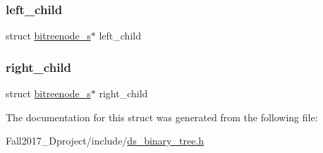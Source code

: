 \mbox{\label{structbitreenode__s_aca9af0f3ba369b6aff616640a0b842aa}} 
\subsubsection{\texorpdfstring{left\+\_\+child}{left\_child}}
{\footnotesize\ttfamily struct \hyperlink{structbitreenode__s}{bitreenode\+\_\+s}$\ast$ left\+\_\+child}

\mbox{\label{structbitreenode__s_a27d28175093bd9993fc8ad15496114c0}} 
\subsubsection{\texorpdfstring{right\+\_\+child}{right\_child}}
{\footnotesize\ttfamily struct \hyperlink{structbitreenode__s}{bitreenode\+\_\+s}$\ast$ right\+\_\+child}



The documentation for this struct was generated from the following file\+:\begin{DoxyCompactItemize}
\item 
Fall2017\+\_\+Dproject/include/\hyperlink{ds__binary__tree_8h}{ds\+\_\+binary\+\_\+tree.\+h}\end{DoxyCompactItemize}
